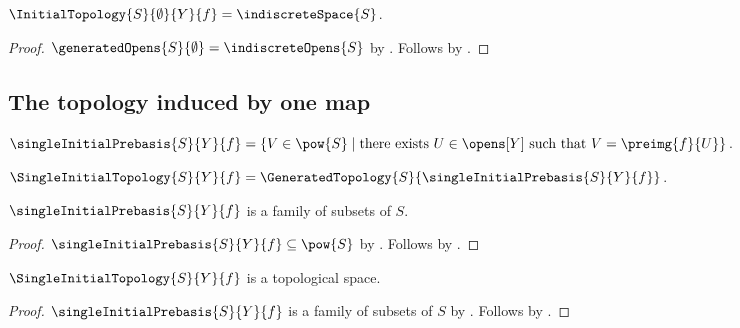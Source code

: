 \begin{theorem}\label{empty_initial_topology_is_indiscrete}
    $\InitialTopology{S}{\emptyset}{Y}{f}=\indiscreteSpace{S}$.
\end{theorem}
\begin{proof}
    $\generatedOpens{S}{\emptyset}=\indiscreteOpens{S}$ by
        .
    Follows by
        .
\end{proof}

\subsection{The topology induced by one map}

\begin{definition}\label{single_initial_prebasis}
    $\singleInitialPrebasis{S}{Y}{f}
        =\{V\in\pow{S}\mid
            \text{there exists $U\in\opens[Y]$ such that
                $V=\preimg{f}{U}$}\}$.
\end{definition}

\begin{definition}\label{single_initial_topology}
    $\SingleInitialTopology{S}{Y}{f}
        =\GeneratedTopology{S}{\singleInitialPrebasis{S}{Y}{f}}$.
\end{definition}

\begin{proposition}\label{single_initial_prebasis_type}
    $\singleInitialPrebasis{S}{Y}{f}$ is a family of subsets of $S$.
\end{proposition}
\begin{proof}
    $\singleInitialPrebasis{S}{Y}{f}\subseteq\pow{S}$ by
        .
    Follows by .
\end{proof}

\begin{classification}\label{single_initial_topology_is_topological_space}
    $\SingleInitialTopology{S}{Y}{f}$ is a topological space.
\end{classification}
\begin{proof}
    $\singleInitialPrebasis{S}{Y}{f}$ is a family of subsets of $S$ by
        .
    Follows by
        .
\end{proof}

